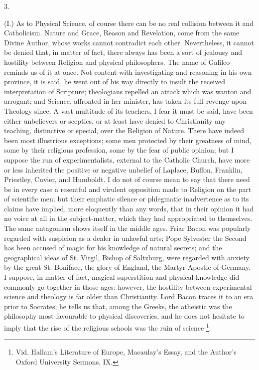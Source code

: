 3.

(I.) As to Physical Science, of course there can be no real
collision between it and Catholicism. Nature and Grace, Reason and
Revelation, come from the same Divine Author, whose works cannot
contradict each other. Nevertheless, it cannot be denied that, in
matter of fact, there always has been a sort of jealousy and hostility
between Religion and physical philosophers. The name of Galileo
reminds us of it at once. Not content with investigating and
reasoning in his own province, it is said, he went out of his way
directly to insult the received interpretation of Scripture;
theologians repelled an attack which was wanton and arrogant; and
Science, affronted in her minister, has taken its full revenge upon
Theology since. A vast multitude of its teachers, I fear it must be
said, have been either unbelievers or sceptics, or at least have
denied to Christianity any teaching, distinctive or special, over the
Religion of Nature. There have indeed been most illustrious
exceptions; some men protected by their greatness of mind, some by
their religious profession, some by the fear of public opinion; but I
suppose the run of experimentalists, external to the Catholic Church,
have more or less inherited the positive or negative unbelief of
Laplace, Buffon, Franklin, Priestley, Cuvier, and Humboldt. I do not
of course mean to say that there need be in every case a resentful and
virulent opposition made to Religion on the part of scientific men;
but their emphatic silence or phlegmatic inadvertence as to its claims
have implied, more eloquently than any words, that in their opinion it
had no voice at all in the subject-matter, which they had appropriated
to themselves. The same antagonism shows itself in the middle ages.
Friar Bacon was popularly regarded with suspicion as a dealer in
unlawful arts; Pope Sylvester the Second has been accused of magic for
his knowledge of natural secrets; and the geographical ideas of St.
Virgil, Bishop of Saltzburg, were regarded with anxiety by the great
St. Boniface, the glory of England, the Martyr-Apostle of Germany. I
suppose, in matter of fact, magical superstition and physical
knowledge did commonly go together in those ages: however, the
hostility between experimental science and theology is far older than
Christianity. Lord Bacon traces it to an era prior to Socrates;
he tells us that, among the Greeks, the atheistic was the philosophy
most favourable to physical discoveries, and he does not hesitate to
imply that the rise of the religious schools was the ruin of science \footnote{Vid. Hallam's Literature of Europe, Macaulay's Essay, and
the Author's Oxford University Sermons, IX.}.


